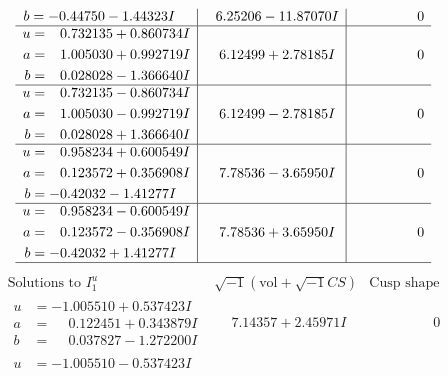\documentclass[1p]{elsarticle_modified}
\theoremstyle{definition}
\newcommand{\I}{\sqrt{-1}}
\begin{document}
$$\begin{array}{c|c|c}
\begin{aligned}
b &= -0.44750 - 1.44323 I\end{aligned}
 & \phantom{-}6.25206 - 11.87070 I & \phantom{-0.000000 } 0 \\ \hline\begin{aligned}
u &= \phantom{-}0.732135 + 0.860734 I \\
a &= \phantom{-}1.005030 + 0.992719 I \\
b &= \phantom{-}0.028028 - 1.366640 I\end{aligned}
 & \phantom{-}6.12499 + 2.78185 I & \phantom{-0.000000 } 0 \\ \hline\begin{aligned}
u &= \phantom{-}0.732135 - 0.860734 I \\
a &= \phantom{-}1.005030 - 0.992719 I \\
b &= \phantom{-}0.028028 + 1.366640 I\end{aligned}
 & \phantom{-}6.12499 - 2.78185 I & \phantom{-0.000000 } 0 \\ \hline\begin{aligned}
u &= \phantom{-}0.958234 + 0.600549 I \\
a &= \phantom{-}0.123572 + 0.356908 I \\
b &= -0.42032 - 1.41277 I\end{aligned}
 & \phantom{-}7.78536 - 3.65950 I & \phantom{-0.000000 } 0 \\ \hline\begin{aligned}
u &= \phantom{-}0.958234 - 0.600549 I \\
a &= \phantom{-}0.123572 - 0.356908 I \\
b &= -0.42032 + 1.41277 I\end{aligned}
 & \phantom{-}7.78536 + 3.65950 I & \phantom{-0.000000 } 0\\
 \hline 
 \end{array}$$\newpage$$\begin{array}{c|c|c}  
\text{Solutions to }I^u_{1}& \I (\text{vol} + \sqrt{-1}CS) & \text{Cusp shape}\\
 \hline 
\begin{aligned}
u &= -1.005510 + 0.537423 I \\
a &= \phantom{-}0.122451 + 0.343879 I \\
b &= \phantom{-}0.037827 - 1.272200 I\end{aligned}
 & \phantom{-}7.14357 + 2.45971 I & \phantom{-0.000000 } 0 \\ \hline\begin{aligned}
u &= -1.005510 - 0.537423 I \\

\end{aligned}
\end{array}$$
\end{document}
